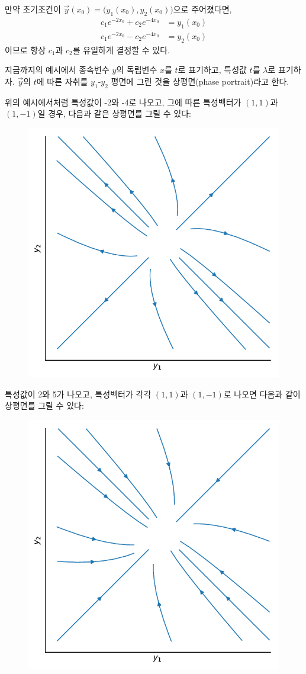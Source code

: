 \documentclass[../engineering_mathematics_lecture_note.tex]{subfiles}
\begin{document}
\begin{example}
    만약 초기조건이 $\vec y(x_0) = \bigl(y_1(x_0), y_2(x_0) \bigr)$으로 주어졌다면,
    \begin{align*}
        c_1 e^{-2 x_0} + c_2 e^{-4 x_0} &= y_1(x_0)\\
        c_1 e^{-2 x_0} - c_2 e^{-4 x_0} &= y_2(x_0)
    \end{align*}
    이므로 항상 $c_1$과 $c_2$를 유일하게 결정할 수 있다.
\end{example}

지금까지의 예시에서 종속변수 $y$의 독립변수 $x$를 $t$로 표기하고, 특성값 $t$를 $\lambda$로 표기하자.
$\vec y$의 $t$에 따른 자취를 $y_1$-$y_2$ 평면에 그린 것을 상평면(phase portrait)라고 한다.

위의 예시에서처럼 특성값이 -2와 -4로 나오고, 그에 따른 특성벡터가 $(1, 1)$과 $(1, -1)$일 경우, 다음과 같은 상평면를 그릴 수 있다:
\begin{figure}[H]
    \centering
    \includegraphics[width=0.5\linewidth]{plots/ex2.pdf}
    \label{fig:plots/ex2.pdf}
\end{figure}

특성값이 2와 5가 나오고, 특성벡터가 각각 $(1, 1)$과 $(1, -1)$로 나오면 다음과 같이 상평면를 그릴 수 있다:
\begin{figure}[H]
    \centering
    \includegraphics[width=0.5\linewidth]{plots/ex1.pdf}
    \label{fig:plots/ex1.pdf}
\end{figure}
\end{document}
